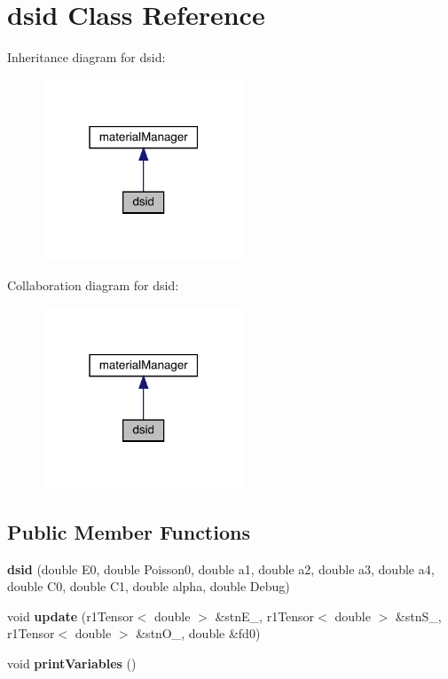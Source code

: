 \hypertarget{classdsid}{}\section{dsid Class Reference}
\label{classdsid}


Inheritance diagram for dsid\+:
\nopagebreak
\begin{figure}[H]
\begin{center}
\leavevmode
\includegraphics[width=171pt]{classdsid__inherit__graph}
\end{center}
\end{figure}


Collaboration diagram for dsid\+:
\nopagebreak
\begin{figure}[H]
\begin{center}
\leavevmode
\includegraphics[width=171pt]{classdsid__coll__graph}
\end{center}
\end{figure}
\subsection*{Public Member Functions}
\begin{DoxyCompactItemize}
\item 
\mbox{\label{classdsid_af56f1cb60f8a6d3c05ca03f08903fd9c}} 
{\bfseries dsid} (double E0, double Poisson0, double a1, double a2, double a3, double a4, double C0, double C1, double alpha, double Debug)
\item 
\mbox{\label{classdsid_a2a80c33f9ab37eaa2668ba2babf2085d}} 
void {\bfseries update} (r1\+Tensor$<$ double $>$ \&stn\+E\+\_\+, r1\+Tensor$<$ double $>$ \&stn\+S\+\_\+, r1\+Tensor$<$ double $>$ \&stn\+O\+\_\+, double \&fd0)
\item 
\mbox{\label{classdsid_a7710e2004a4704ed03eaa9b196bf183d}} 
void {\bfseries print\+Variables} ()
\end{DoxyCompactItemize}


